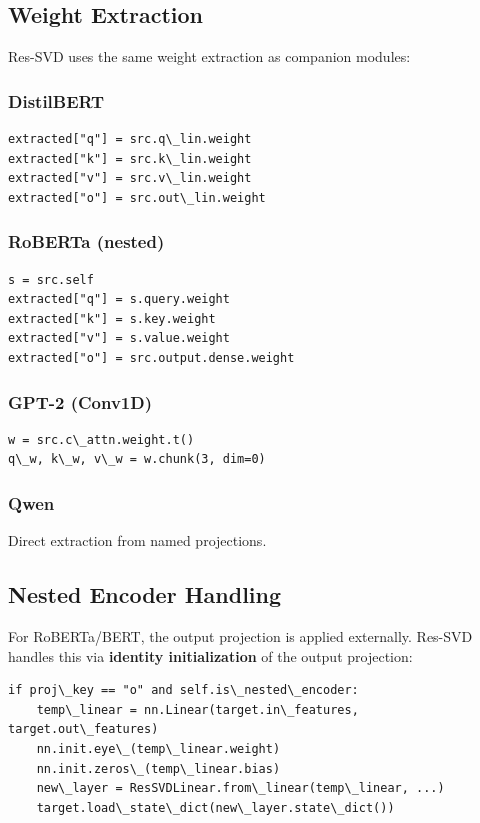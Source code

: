 \subsection{Weight Extraction}

Res-SVD uses the same weight extraction as companion modules:

\subsubsection{DistilBERT}

\begin{lstlisting}
extracted["q"] = src.q\_lin.weight
extracted["k"] = src.k\_lin.weight
extracted["v"] = src.v\_lin.weight
extracted["o"] = src.out\_lin.weight
\end{lstlisting}

\subsubsection{RoBERTa (nested)}

\begin{lstlisting}
s = src.self
extracted["q"] = s.query.weight
extracted["k"] = s.key.weight
extracted["v"] = s.value.weight
extracted["o"] = src.output.dense.weight
\end{lstlisting}

\subsubsection{GPT-2 (Conv1D)}

\begin{lstlisting}
w = src.c\_attn.weight.t()
q\_w, k\_w, v\_w = w.chunk(3, dim=0)
\end{lstlisting}

\subsubsection{Qwen}

Direct extraction from named projections.

\subsection{Nested Encoder Handling}

For RoBERTa/BERT, the output projection is applied externally. 
Res-SVD handles this via \textbf{identity initialization} of the output projection:

\begin{lstlisting}
if proj\_key == "o" and self.is\_nested\_encoder:
    temp\_linear = nn.Linear(target.in\_features, target.out\_features)
    nn.init.eye\_(temp\_linear.weight)
    nn.init.zeros\_(temp\_linear.bias)
    new\_layer = ResSVDLinear.from\_linear(temp\_linear, ...)
    target.load\_state\_dict(new\_layer.state\_dict())
\end{lstlisting}

